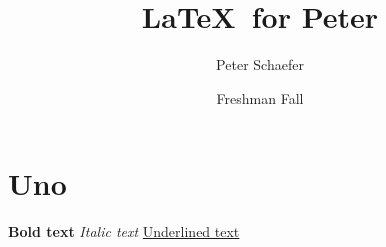 \documentclass{article}
\title{\LaTeX\ for Peter}
\author{Peter Schaefer}
\date{Freshman Fall}
\begin{document}
\maketitle

\tableofcontents

\newpage

\section{Uno}

\textbf{Bold text}
\textit{Italic text}
\underline{Underlined text}
\end{document}
